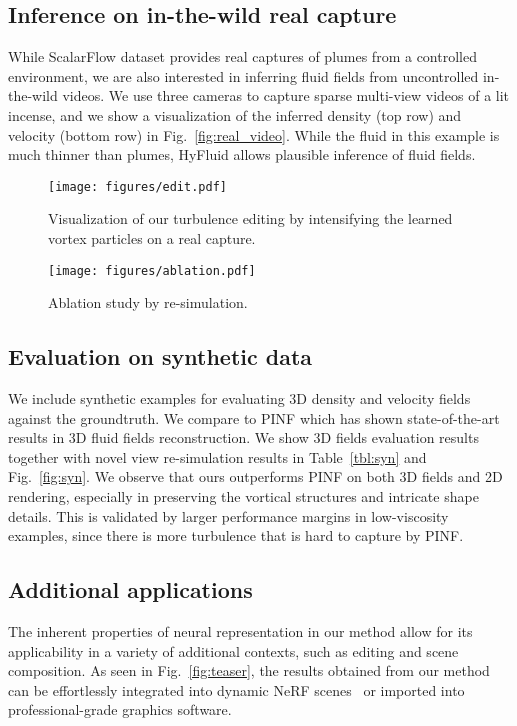 \documentclass{article}
\newcommand{\fig}[1]{Fig.~\ref{#1}}
\newcommand{\tbl}[1]{Table~\ref{#1}}
\newcommand{\model}{HyFluid\xspace}
\begin{document}
\subsection{Inference on in-the-wild real capture}
While ScalarFlow dataset provides real captures of plumes from a controlled environment, we are also interested in inferring fluid fields from uncontrolled in-the-wild videos. We use three cameras to capture sparse multi-view videos of a lit incense, and we show a visualization of the inferred density (top row) and velocity (bottom row) in \fig{fig:real_video}. While the fluid in this example is much thinner than plumes, \model allows plausible inference of fluid fields.



\begin{figure}[t]
\begin{minipage}[c]{0.56\linewidth}
  \centering
  \texttt{[image: figures/edit.pdf]}
  \vspace{-0.1cm}
    \caption{Visualization of our turbulence editing by intensifying the learned vortex particles on a real capture.}
    \label{fig:editing}
\end{minipage}
\hfill
\begin{minipage}[c]{0.4\linewidth}
  \centering
  \texttt{[image: figures/ablation.pdf]}
  \vspace{-0.25cm}
  \caption{Ablation study by re-simulation.}\label{fig:ablation}
\end{minipage}
\vspace{-0.1cm}
\end{figure}
 
\subsection{Evaluation on synthetic data}
We include synthetic examples for evaluating 3D density and velocity fields against the groundtruth. We compare to PINF which has shown state-of-the-art results in 3D fluid fields reconstruction. We show 3D fields evaluation results together with novel view re-simulation results in \tbl{tbl:syn} and \fig{fig:syn}. We observe that ours outperforms PINF on both 3D fields and 2D rendering, especially in preserving the vortical structures and intricate shape details. This is validated by larger performance margins in low-viscosity examples, since there is more turbulence that is hard to capture by PINF. 


\subsection{Additional applications} The inherent properties of neural representation in our method allow for its applicability in a variety of additional contexts, such as editing and scene composition. As seen in \fig{fig:teaser}, the results obtained from our method can be effortlessly integrated into dynamic NeRF scenes~\citep{kplanes_2023} or imported into professional-grade graphics software. 
\end{document}
